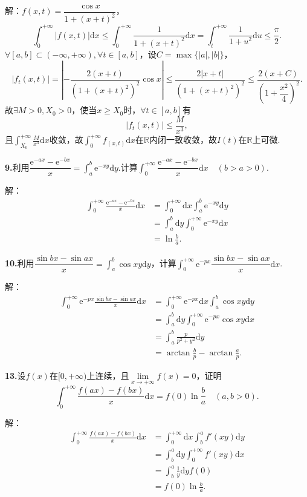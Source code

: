 \documentclass[12pt, a4paper]{article}
\newcommand{\RR}{\mathbb{R}}
\newcommand{\e}{\mathrm{e}}
\newcommand{\dif}{\mathrm{d}}
\begin{document}
解：\(f(x, t) = \dfrac{\cos x}{1 + (x + t)^2}\)，
\[\int_{0}^{+\infty} |f(x, t)|\dif x \leq \int_{0}^{+\infty} \frac{1}{1 + (x + t)^2}\dif x = \int_{t}^{+\infty} \frac{1}{1 + u^2}\dif u \leq \frac{\pi}{2}.\]
\(\forall [a, b] \subset (-\infty, +\infty), \forall t \in [a, b]\)，设\(C = \max\{|a|, |b|\}\)，
\[|f_t(x, t)| = \left|-\frac{2(x + t)}{(1 + (x + t)^2)^2}\cos x\right| \leq \frac{2|x + t|}{(1 + (x + t)^2)^2} \leq \frac{2(x + C)}{\left(1 + \dfrac{x^2}{4}\right)^2}.\]
故\(\exists M > 0, X_0 > 0\)，使当\(x \geq X_0\)时，\(\forall t \in [a, b]\)有
\[|f_t(x, t)| \leq \frac{M}{x^3},\]
且\(\int_{X_0}^{+\infty} \frac{M}{x^3}\dif x\)收敛，故\(\int_{0}^{+\infty} f_(x, t)\dif x\)在\(\RR\)内闭一致收敛，故\(I(t)\)在\(\RR\)上可微.

\textbf{9.}利用\(\dfrac{\e^{-ax} - \e^{-bx}}{x} = \int_a^b \e^{-xy}\dif y\).计算\(\int_{0}^{+\infty} \dfrac{\e^{-ax} - \e^{-bx}}{x}\dif x \quad (b > a > 0)\).

解：
\begin{align*}
\int_{0}^{+\infty} \frac{\e^{-ax} - \e^{-bx}}{x}\dif x &= \int_{0}^{+\infty} \dif x\int_a^b \e^{-xy}\dif y \\
&= \int_a^b \dif y\int_{0}^{+\infty} \e^{-xy}\dif x \\
&= \ln\frac{b}{a}.
\end{align*}

\textbf{10.}利用\(\dfrac{\sin bx - \sin ax}{x} = \int_a^b \cos xy\dif y\)，计算\(\int_{0}^{+\infty} \e^{-px}\dfrac{\sin bx - \sin ax}{x}\dif x\).

解：
\begin{align*}
\int_{0}^{+\infty} \e^{-px}\frac{\sin bx - \sin ax}{x}\dif x &= \int_{0}^{+\infty} \e^{-px}\dif x\int_a^b \cos xy\dif y \\
&= \int_a^b \dif y\int_{0}^{+\infty} \e^{-px} \cos xy\dif x \\
&= \int_a^b \frac{p}{p^2 + y^2}\dif y \\
&= \arctan\frac{b}{p} - \arctan\frac{a}{p}.
\end{align*}

\textbf{13.}设\(f(x)\)在\([0, +\infty)\)上连续，且\(\lim\limits_{x \to +\infty} f(x) = 0\)，证明
\[\int_{0}^{+\infty} \frac{f(ax) - f(bx)}{x}\dif x = f(0)\ln\frac{b}{a} \quad (a, b > 0).\]

解：
\begin{align*}
\int_{0}^{+\infty} \frac{f(ax) - f(bx)}{x}\dif x &= \int_{0}^{+\infty} \dif x\int_b^a f'(xy) \dif y \\
&= \int_b^a \dif y\int_{0}^{+\infty} f'(xy) \dif x \\
&= \int_b^a \frac{1}{y} \dif y f(0) \\
&= f(0)\ln\frac{b}{a}.
\end{align*}
\end{document}
